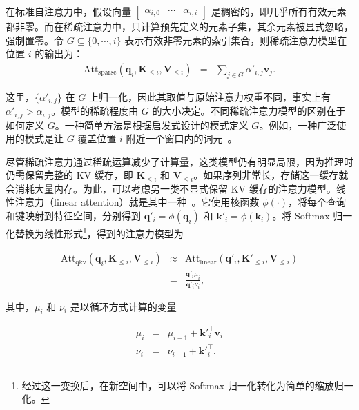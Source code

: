 在标准自注意力中，假设向量 $\begin{bmatrix} \alpha_{i,0} & \cdots & \alpha_{i,i} \end{bmatrix}$ 是稠密的，即几乎所有有效元素都非零。而在稀疏注意力中，只计算预先定义的元素子集，其余元素被显式忽略，强制置零。令 $G \subseteq \{0,\cdots,i\}$ 表示有效非零元素的索引集合，则稀疏注意力模型在位置 $i$ 的输出为：
\begin{eqnarray}
\mathrm{Att}_{\mathrm{sparse}}(\mathbf{q}_i,\mathbf{K}_{\le i},\mathbf{V}_{\le i}) & = & \sum_{j \in G} \alpha'_{i,j} \mathbf{v}_{j}.
\end{eqnarray}

\noindent 这里，$\{\alpha'_{i,j}\}$ 在 $G$ 上归一化，因此其取值与原始注意力权重不同，事实上有 $\alpha'_{i,j} > \alpha_{i,j}$。模型的稀疏程度由 $G$ 的大小决定。不同稀疏注意力模型的区别在于如何定义 $G$。一种简单方法是根据启发式设计的模式定义 $G$。例如，一种广泛使用的模式是让 $G$ 覆盖位置 $i$ 附近一个窗口内的词元~\cite{parmar-etal:2018image}。

尽管稀疏注意力通过稀疏运算减少了计算量，这类模型仍有明显局限，因为推理时仍需保留完整的 KV 缓存，即 $\mathbf{K}_{\le i}$ 和 $\mathbf{V}_{\le i}$。如果序列非常长，存储这一缓存就会消耗大量内存。为此，可以考虑另一类不显式保留 KV 缓存的注意力模型。线性注意力（linear attention）就是其中一种~\cite{katharopoulos-etal:2020transformers}。它使用核函数 $\phi(\cdot)$，将每个查询和键映射到特征空间，分别得到 $\mathbf{q}'_i = \phi(\mathbf{q}_i)$ 和 $\mathbf{k}'_i = \phi(\mathbf{k}_i)$。将 Softmax 归一化替换为线性形式\footnote{经过这一变换后，在新空间中，可以将 Softmax 归一化转化为简单的缩放归一化。}，得到的注意力模型为

\begin{eqnarray}
\mathrm{Att}_{\mathrm{qkv}}(\mathbf{q}_i,\mathbf{K}_{\le i},\mathbf{V}_{\le i}) & \approx & \mathrm{Att}_{\mathrm{linear}}(\mathbf{q}'_i,\mathbf{K}'_{\le i},\mathbf{V}_{\le i}) \nonumber \\
                                                                                & = & \frac{\mathbf{q}'_{i} \mu_i}{\mathbf{q}'_{i} \nu_i},
\end{eqnarray}

\noindent 其中，$\mu_i$ 和 $\nu_i$ 是以循环方式计算的变量

\begin{eqnarray}
\mu_i & = & \mu_{i-1} + {\mathbf{k}'}_{i}^\top \mathbf{v}_{i} \label{eq:linear-attention-mu-llm} \\
\nu_i & = & \nu_{i-1} + {\mathbf{k}'}_{i}^\top \label{eq:linear-attention-nu-llm}.
\end{eqnarray}

